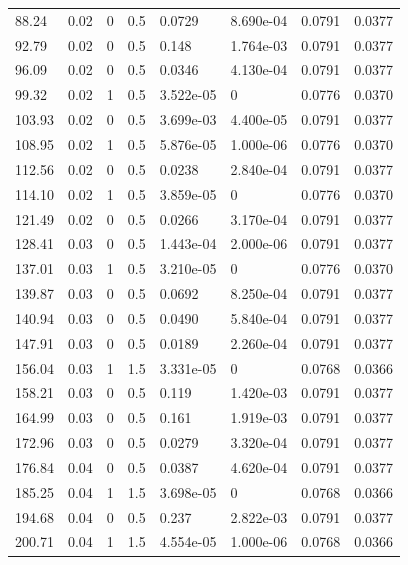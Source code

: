 \documentclass[preview]{standalone}
\begin{document}
{{\begin{tabular}{L{1.2cm}C{1.2cm} C{0.3cm}C{0.5cm} C{1.4cm}C{1.4cm} C{1.4cm}C{1.4cm}}
  88.24  &  0.02  & 0     & 0.5 &  0.0729  & 8.690e-04  & 0.0791 &  0.0377   \\ 
  92.79  &  0.02  & 0     & 0.5 &  0.148  & 1.764e-03  & 0.0791 &  0.0377   \\ 
  96.09  &  0.02  & 0     & 0.5 &  0.0346  & 4.130e-04  & 0.0791 &  0.0377   \\ 
  99.32  &  0.02  & 1     & 0.5 &  3.522e-05  & 0  & 0.0776 &  0.0370   \\ 
  103.93  &  0.02  & 0     & 0.5 &  3.699e-03  & 4.400e-05  & 0.0791 &  0.0377   \\ 
  108.95  &  0.02  & 1     & 0.5 &  5.876e-05  & 1.000e-06  & 0.0776 &  0.0370   \\ 
  112.56  &  0.02  & 0     & 0.5 &  0.0238  & 2.840e-04  & 0.0791 &  0.0377   \\ 
  114.10  &  0.02  & 1     & 0.5 &  3.859e-05  & 0  & 0.0776 &  0.0370   \\ 
  121.49  &  0.02  & 0     & 0.5 &  0.0266  & 3.170e-04  & 0.0791 &  0.0377   \\ 
  128.41  &  0.03  & 0     & 0.5 &  1.443e-04  & 2.000e-06  & 0.0791 &  0.0377   \\ 
  137.01  &  0.03  & 1     & 0.5 &  3.210e-05  & 0  & 0.0776 &  0.0370   \\ 
  139.87  &  0.03  & 0     & 0.5 &  0.0692  & 8.250e-04  & 0.0791 &  0.0377   \\ 
  140.94  &  0.03  & 0     & 0.5 &  0.0490  & 5.840e-04  & 0.0791 &  0.0377   \\ 
  147.91  &  0.03  & 0     & 0.5 &  0.0189  & 2.260e-04  & 0.0791 &  0.0377   \\ 
  156.04  &  0.03  & 1     & 1.5 &  3.331e-05  & 0  & 0.0768 &  0.0366   \\ 
  158.21  &  0.03  & 0     & 0.5 &  0.119  & 1.420e-03  & 0.0791 &  0.0377   \\ 
  164.99  &  0.03  & 0     & 0.5 &  0.161  & 1.919e-03  & 0.0791 &  0.0377   \\ 
  172.96  &  0.03  & 0     & 0.5 &  0.0279  & 3.320e-04  & 0.0791 &  0.0377   \\ 
  176.84  &  0.04  & 0     & 0.5 &  0.0387  & 4.620e-04  & 0.0791 &  0.0377   \\ 
  185.25  &  0.04  & 1     & 1.5 &  3.698e-05  & 0  & 0.0768 &  0.0366   \\ 
  194.68  &  0.04  & 0     & 0.5 &  0.237  & 2.822e-03  & 0.0791 &  0.0377   \\ 
  200.71  &  0.04  & 1     & 1.5 &  4.554e-05  & 1.000e-06  & 0.0768 &  0.0366   \\ 

\end{tabular}}}
\end{document}
